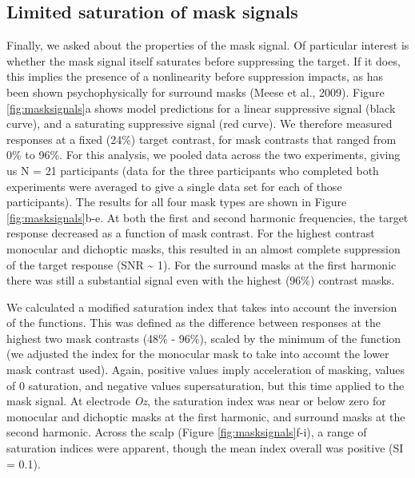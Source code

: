 \documentclass[]{article}
\begin{document}
\hypertarget{limited-saturation-of-mask-signals}{%
\subsection{Limited saturation of mask signals}\label{limited-saturation-of-mask-signals}}

Finally, we asked about the properties of the mask signal. Of particular interest is whether the mask signal itself saturates before suppressing the target. If it does, this implies the presence of a nonlinearity before suppression impacts, as has been shown psychophysically for surround masks (Meese et al., 2009). Figure \ref{fig:masksignals}a shows model predictions for a linear suppressive signal (black curve), and a saturating suppressive signal (red curve). We therefore measured responses at a fixed (24\%) target contrast, for mask contrasts that ranged from 0\% to 96\%. For this analysis, we pooled data across the two experiments, giving us N = 21 participants (data for the three participants who completed both experiments were averaged to give a single data set for each of those participants). The results for all four mask types are shown in Figure \ref{fig:masksignals}b-e. At both the first and second harmonic frequencies, the target response decreased as a function of mask contrast. For the highest contrast monocular and dichoptic masks, this resulted in an almost complete suppression of the target response (SNR \textasciitilde{} 1). For the surround masks at the first harmonic there was still a substantial signal even with the highest (96\%) contrast masks.

We calculated a modified saturation index that takes into account the inversion of the functions. This was defined as the difference between responses at the highest two mask contrasts (48\% - 96\%), scaled by the minimum of the function (we adjusted the index for the monocular mask to take into account the lower mask contrast used). Again, positive values imply acceleration of masking, values of 0 saturation, and negative values supersaturation, but this time applied to the mask signal. At electrode \emph{Oz}, the saturation index was near or below zero for monocular and dichoptic masks at the first harmonic, and surround masks at the second harmonic. Across the scalp (Figure \ref{fig:masksignals}f-i), a range of saturation indices were apparent, though the mean index overall was positive (SI = 0.1).
\end{document}
